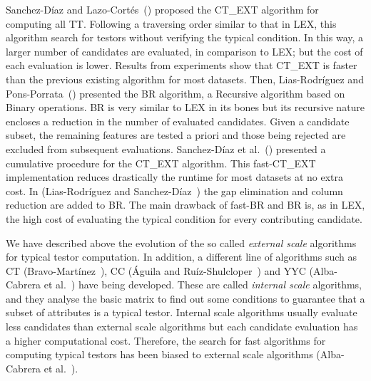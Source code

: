 \documentclass[citeauthoryear]{llncs}
\begin{document}
	Sanchez-D\'iaz and Lazo-Cort\'es~(\cite{Sanchez2007}) proposed the CT\_EXT algorithm for computing all TT. Following a traversing order similar to that in LEX, this algorithm search for testors without verifying the typical condition. In this way, a larger number of candidates are evaluated, in comparison to LEX; but the cost of each evaluation is lower. Results from experiments	show that CT\_EXT is faster than the previous existing algorithm for most datasets. Then, Lias-Rodr\'iguez and Pons-Porrata~(\cite{Lias2009}) presented the BR algorithm, a Recursive algorithm based on Binary operations. BR is very similar to LEX in its bones but its recursive nature encloses a reduction in the number of evaluated candidates. Given a candidate subset, the remaining features are tested a priori and those being rejected are excluded from subsequent evaluations. Sanchez-D\'iaz et al.~(\cite{Sanchez2010}) presented a cumulative procedure for the CT\_EXT algorithm. This fast-CT\_EXT implementation reduces drastically the runtime for most datasets at no extra cost. In (Lias-Rodr\'iguez and Sanchez-D\'iaz~\cite{Lias2013}) the gap elimination and column reduction are added to BR. The main drawback of fast-BR and BR is, as in LEX, the high cost of evaluating the typical condition for every contributing candidate. 
	
	We have described above the evolution of the so called \emph{external scale} algorithms for typical testor computation. In addition, a different line of algorithms such as CT (Bravo-Martínez~\cite{Bravo83}), CC (Águila and Ruíz-Shulcloper~\cite{Aguila84}) and YYC (Alba-Cabrera et al.~\cite{Alba14}) have being developed. These are called \emph{internal scale} algorithms, and they analyse the basic matrix to find out some conditions to guarantee that a subset of attributes is a typical testor. Internal scale algorithms usually evaluate less candidates than external scale algorithms but each candidate evaluation has a higher computational cost. Therefore, the search for fast algorithms for computing typical testors has been biased to external scale algorithms (Alba-Cabrera et al.~\cite{Alba14}).
	
\end{document}
